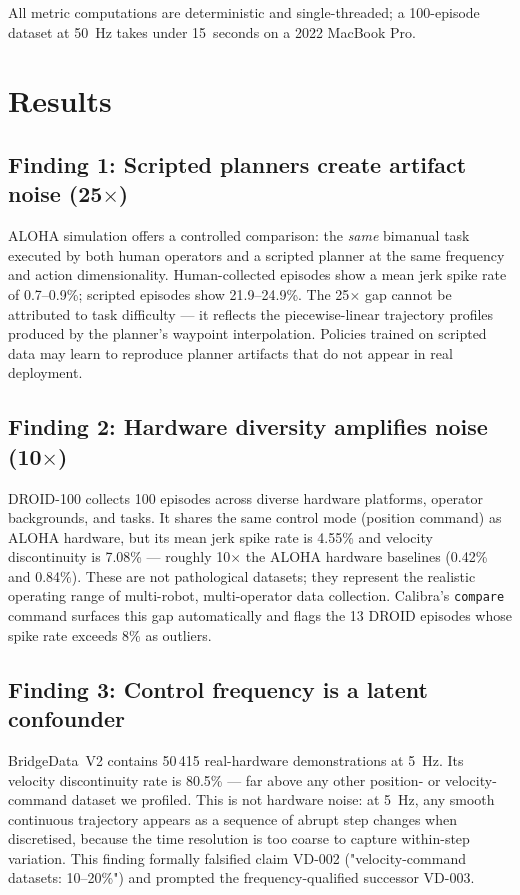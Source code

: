 \documentclass[10pt,twocolumn]{article}
\begin{document}
All metric computations are deterministic and single-threaded; a 100-episode
dataset at 50~Hz takes under 15~seconds on a 2022 MacBook Pro.

\section{Results}
\label{sec:results}

\subsection{Finding 1: Scripted planners create artifact noise (25$\times$)}

ALOHA simulation offers a controlled comparison: the \emph{same} bimanual
task executed by both human operators and a scripted planner at the same
frequency and action dimensionality. Human-collected episodes show a mean
jerk spike rate of 0.7--0.9\%; scripted episodes show 21.9--24.9\%. The
25$\times$ gap cannot be attributed to task difficulty — it reflects the
piecewise-linear trajectory profiles produced by the planner's
waypoint interpolation. Policies trained on scripted data may learn to
reproduce planner artifacts that do not appear in real deployment.

\subsection{Finding 2: Hardware diversity amplifies noise (10$\times$)}

DROID-100 collects 100 episodes across diverse hardware platforms, operator
backgrounds, and tasks. It shares the same control mode (position command)
as ALOHA hardware, but its mean jerk spike rate is 4.55\% and velocity
discontinuity is 7.08\% — roughly 10$\times$ the ALOHA hardware baselines
(0.42\% and 0.84\%). These are not pathological datasets; they represent
the realistic operating range of multi-robot, multi-operator data collection.
Calibra's \texttt{compare} command surfaces this gap automatically and
flags the 13 DROID episodes whose spike rate exceeds 8\% as outliers.

\subsection{Finding 3: Control frequency is a latent confounder}

BridgeData~V2 contains 50\,415 real-hardware demonstrations at 5~Hz.
Its velocity discontinuity rate is 80.5\% — far above any other
position- or velocity-command dataset we profiled. This is not hardware
noise: at 5~Hz, any smooth continuous trajectory appears as a sequence
of abrupt step changes when discretised, because the time resolution is
too coarse to capture within-step variation. This finding formally
falsified claim VD-002 ("velocity-command datasets: 10--20\%") and
prompted the frequency-qualified successor VD-003.
\end{document}
